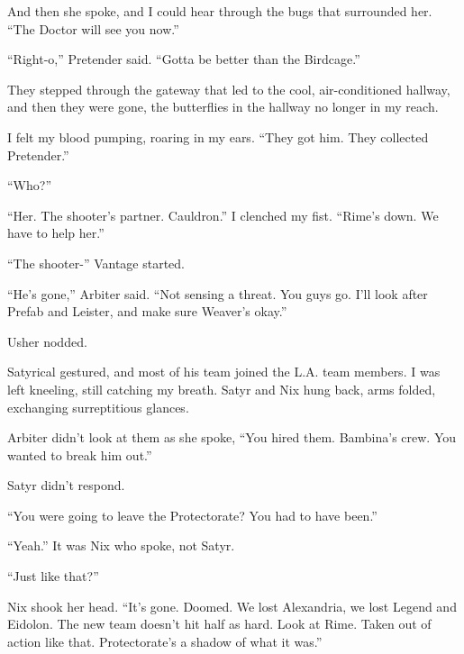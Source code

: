 And then she spoke, and I could hear through the bugs that surrounded her.  ``The Doctor will see you now.''



``Right-o,'' Pretender said.  ``Gotta be better than the Birdcage.''



They stepped through the gateway that led to the cool, air-conditioned hallway, and then they were gone, the butterflies in the hallway no longer in my reach.



I felt my blood pumping, roaring in my ears.  ``They got him.  They collected Pretender.''



``Who?''



``Her.  The shooter's partner.  Cauldron.''  I clenched my fist.  ``Rime's down.  We have to help her.''



``The shooter-'' Vantage started.



``He's gone,'' Arbiter said.  ``Not sensing a threat.  You guys go.  I'll look after Prefab and Leister, and make sure Weaver's okay.''



Usher nodded.



Satyrical gestured, and most of his team joined the L.A. team members.  I was left kneeling, still catching my breath.  Satyr and Nix hung back, arms folded, exchanging surreptitious glances.



Arbiter didn't look at them as she spoke, ``You hired them.  Bambina's crew.  You wanted to break him out.''



Satyr didn't respond.



``You were going to leave the Protectorate?  You had to have been.''



``Yeah.''  It was Nix who spoke, not Satyr.



``Just like that?''



Nix shook her head.  ``It's gone.  Doomed.  We lost Alexandria, we lost Legend and Eidolon.  The new team doesn't hit half as hard.  Look at Rime.  Taken out of action like that.  Protectorate's a shadow of what it was.''



